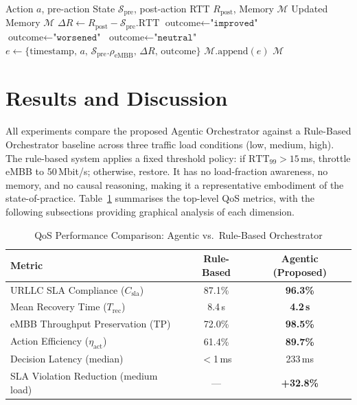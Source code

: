 \documentclass[12pt]{article}
\begin{document}
\begin{algorithm}[H]
\caption{Memory-Assisted Decision Process (C5)}
\label{alg:memory}
\begin{algorithmic}[1]
\Require Action $a$, pre-action State $\mathcal{S}_{\text{pre}}$, post-action RTT $R_{\text{post}}$, Memory $\mathcal{M}$
\Ensure Updated Memory $\mathcal{M}$
\State $\Delta R \gets R_{\text{post}} - \mathcal{S}_{\text{pre}}.\text{RTT}$
  \State $\text{outcome} \gets \texttt{"improved"}$
  \State $\text{outcome} \gets \texttt{"worsened"}$
\Else
  \State $\text{outcome} \gets \texttt{"neutral"}$
\EndIf
\State $e \gets \{\text{timestamp},\, a,\, \mathcal{S}_{\text{pre}}.\rho_{\text{eMBB}},\, \Delta R,\, \text{outcome}\}$
\State $\mathcal{M}.\text{append}(e)$ 
\Return $\mathcal{M}$
\end{algorithmic}
\end{algorithm}

\section{Results and Discussion}
\label{sec:results}

All experiments compare the proposed Agentic Orchestrator against a
Rule-Based Orchestrator baseline across three traffic load conditions
(low, medium, high). The rule-based system applies a fixed threshold
policy: if $\text{RTT}_{99} > 15$\,ms, throttle eMBB to 50\,Mbit/s;
otherwise, restore. It has no load-fraction awareness, no memory, and no
causal reasoning, making it a representative embodiment of the
state-of-practice. Table~\ref{tab:results} summarises the top-level QoS
metrics, with the following subsections providing graphical analysis of
each dimension.

\begin{table}[H]
\centering
\caption{QoS Performance Comparison: Agentic vs.\ Rule-Based Orchestrator}
\label{tab:results}
\begin{tabular}{@{}lcc@{}}
\toprule
\textbf{Metric} & \textbf{Rule-Based} & \textbf{Agentic (Proposed)} \\
\midrule
URLLC SLA Compliance ($C_\text{sla}$)
  & 87.1\%   & \textbf{96.3\%}  \\
Mean Recovery Time ($T_\text{rec}$)
  & 8.4\,s   & \textbf{4.2\,s}  \\
eMBB Throughput Preservation (TP)
  & 72.0\%   & \textbf{98.5\%}  \\
Action Efficiency ($\eta_\text{act}$)
  & 61.4\%   & \textbf{89.7\%}  \\
Decision Latency (median)
  & $<$1\,ms & 233\,ms          \\
SLA Violation Reduction (medium load)
  & ---       & \textbf{+32.8\%}\\
\bottomrule
\end{tabular}
\end{table}
\end{document}
